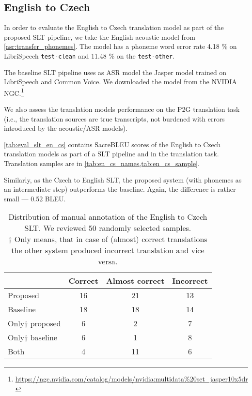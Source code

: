 \subsection{English to Czech}
In order to evaluate the English to Czech translation model as part of the proposed SLT pipeline, we take the English acoustic model from \cref{asr:transfer_phonemes}. The model has a phoneme word error rate 4.18 \% on LibriSpeech \texttt{test-clean} and 11.48 \% on the \texttt{test-other}.

The baseline SLT pipeline uses as ASR model the Jasper model trained on LibriSpeech and Common Voice. We downloaded the model from the NVIDIA NGC.\footnote{\url{https://ngc.nvidia.com/catalog/models/nvidia:multidata\%20set\_jasper10x5dr}}

We also assess the translation models performance on the P2G translation task (i.e., the translation sources are true transcripts, not burdened with errors introduced by the acoustic/ASR models).

\cref{tab:eval_slt_en_cs} contains SacreBLEU scores of the English to Czech translation models as part of a SLT pipeline and in the translation task. Translation samples are in \cref{tab:en_cs_names,tab:en_cs_sample}.

Similarly, as the Czech to English SLT, the proposed system (with phonemes as an intermediate step) outperforms the baseline. Again, the difference is rather small --- 0.52 BLEU. 

\begin{table}[t]
	\centering
	\begin{tabular}{l|ccc}
		& Correct & Almost correct & Incorrect \\ \hline
		Proposed      & 16      & 21             & 13        \\
		Baseline      & 18       & 18             & 14        \\ \hline
		Only$\dagger$ proposed & 6       & 2              & 7         \\
		Only$\dagger$ baseline & 6       & 1              & 8        \\ \hline
		Both          & 4       & 11              & 6       
	\end{tabular}	
	\caption[English to Czech manual evaluation]{Distribution of manual annotation of the English to Czech SLT. We reviewed 50 randomly selected samples.\\$\dagger$ Only means, that in case of (almost) correct translations the other system produced incorrect translation and vice versa.}
	\label{tab:manual_en_cs}
\end{table}


